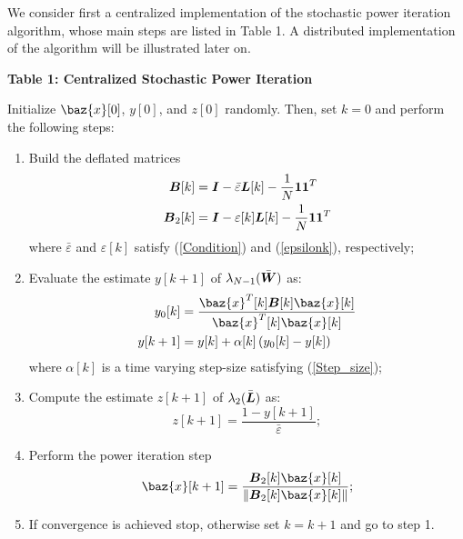 \documentclass[10pt,twocolumn]{IEEEtran}
\def\bB{\mbox{\boldmath $B$}}
\def\bI{\mbox{\boldmath $I$}}
\def\bL{\mbox{\boldmath $L$}}
\def\bW{\mbox{\boldmath $W$}}
\def\bx{\baz{x}}
\begin{document}
We consider first a centralized implementation of the stochastic power iteration algorithm, whose main steps
are listed in Table 1. A distributed implementation of the algorithm will be illustrated later on.
\begin{algorithm}
\caption*{\textbf{Table 1: Centralized Stochastic Power Iteration}}

\vspace{.2cm}
Initialize $\bx[0]$, $y[0]$, and $z[0]$ randomly. Then, set $k=0$ and perform the following steps:
\begin{enumerate}
  \item Build the deflated matrices
        \begin{align}
               \bB[k]&=\bI-\bar{\varepsilon}\bL[k]-\frac{1}{N}\mathbf{1}\mathbf{1}^T\\
               \bB_2[k]&=\bI-\varepsilon[k]\bL[k]-\frac{1}{N}\mathbf{1}\mathbf{1}^T
        \end{align}
        where $\bar{\varepsilon}$ and $\varepsilon[k]$ satisfy (\ref{Condition}) and (\ref{epsilonk}), respectively;
  \item Evaluate the estimate $y[k+1]$ of $\lambda_{N-1}(\bar{\bW})$ as:
        \begin{align}
               y_0[k]&=\frac{\bx^T[k]\bB[k]\bx[k]}{\bx^T[k]\bx[k]}\label{lambdaN-1_2}\\
               y[k+1]&=y[k]+\alpha[k]\left(y_0[k]-y[k]\right)\label{lambdaN-1}
        \end{align}
        where $\alpha[k]$ is a time varying step-size satisfying (\ref{Step_size});
  \item Compute the estimate $z[k+1]$ of $\lambda_2(\bar{\bL})$ as:
       \begin{equation}\label{lambda2_est}
           z[k+1]=\frac{1-y[k+1]}{\bar{\varepsilon}};
       \end{equation}
  \item Perform the power iteration step
        \begin{equation}\label{pow_iter}
           \displaystyle \bx[k+1]=\frac{\bB_2[k]\bx[k]}{\|\bB_2[k]\bx[k]\|};
        \end{equation}
  \item If convergence is achieved stop, otherwise set $k=k+1$ and go to step 1.
\end{enumerate}
\end{algorithm}
\end{document}
